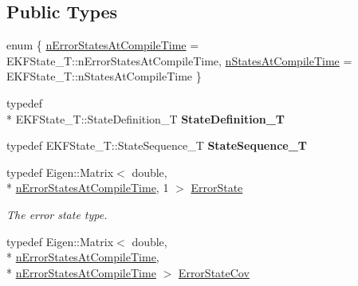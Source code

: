 \subsection*{Public Types}
\begin{DoxyCompactItemize}
\item 
enum \{ \hyperlink{classmsf__core_1_1MSF__Core_a2bca35a2fba08b2fd5cc9963acc9c505afd5aaa703aae2fc6f022eec724b358f6}{n\-Error\-States\-At\-Compile\-Time} =  E\-K\-F\-State\-\_\-\-T\-:\-:n\-Error\-States\-At\-Compile\-Time, 
\hyperlink{classmsf__core_1_1MSF__Core_a2bca35a2fba08b2fd5cc9963acc9c505af1d75af5cfbf0cb1e0e9b04c5d944d6e}{n\-States\-At\-Compile\-Time} =  E\-K\-F\-State\-\_\-\-T\-:\-:n\-States\-At\-Compile\-Time
 \}
\item 
\hypertarget{classmsf__core_1_1MSF__Core_ace7a0e25e3945f3e84a6b16f72d1f1dd}{typedef \\*
E\-K\-F\-State\-\_\-\-T\-::\-State\-Definition\-\_\-\-T {\bfseries State\-Definition\-\_\-\-T}}\label{classmsf__core_1_1MSF__Core_ace7a0e25e3945f3e84a6b16f72d1f1dd}

\item 
\hypertarget{classmsf__core_1_1MSF__Core_af8de96f8f0a8677c79c12563f86b26d3}{typedef E\-K\-F\-State\-\_\-\-T\-::\-State\-Sequence\-\_\-\-T {\bfseries State\-Sequence\-\_\-\-T}}\label{classmsf__core_1_1MSF__Core_af8de96f8f0a8677c79c12563f86b26d3}

\item 
\hypertarget{classmsf__core_1_1MSF__Core_a01a15136971c11456e539f00b88fbf1a}{typedef Eigen\-::\-Matrix$<$ double, \\*
\hyperlink{classmsf__core_1_1MSF__Core_a2bca35a2fba08b2fd5cc9963acc9c505afd5aaa703aae2fc6f022eec724b358f6}{n\-Error\-States\-At\-Compile\-Time}, 1 $>$ \hyperlink{classmsf__core_1_1MSF__Core_a01a15136971c11456e539f00b88fbf1a}{Error\-State}}\label{classmsf__core_1_1MSF__Core_a01a15136971c11456e539f00b88fbf1a}

\begin{DoxyCompactList}\small\item\em The error state type. \end{DoxyCompactList}\item 
\hypertarget{classmsf__core_1_1MSF__Core_ad9b84aa4937f3c8354045b5c97ba2dcc}{typedef Eigen\-::\-Matrix$<$ double, \\*
\hyperlink{classmsf__core_1_1MSF__Core_a2bca35a2fba08b2fd5cc9963acc9c505afd5aaa703aae2fc6f022eec724b358f6}{n\-Error\-States\-At\-Compile\-Time}, \\*
\hyperlink{classmsf__core_1_1MSF__Core_a2bca35a2fba08b2fd5cc9963acc9c505afd5aaa703aae2fc6f022eec724b358f6}{n\-Error\-States\-At\-Compile\-Time} $>$ \hyperlink{classmsf__core_1_1MSF__Core_ad9b84aa4937f3c8354045b5c97ba2dcc}{Error\-State\-Cov}}\label{classmsf__core_1_1MSF__Core_ad9b84aa4937f3c8354045b5c97ba2dcc}


\end{DoxyCompactItemize}
